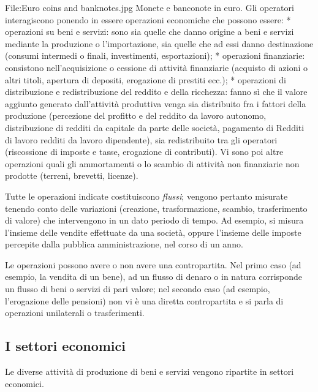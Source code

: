 File:Euro coins and banknotes.jpg Monete e banconote in euro.
Gli operatori interagiscono ponendo in essere operazioni economiche che possono 
essere:
* operazioni su beni e servizi: sono sia quelle che danno origine a beni e 
servizi mediante la produzione o l'importazione, sia quelle che ad essi 
danno destinazione (consumi intermedi o finali, 
investimenti, esportazioni);
* operazioni finanziarie: consistono nell'acquisizione o cessione di 
attività finanziarie (acquisto di azioni o altri 
titoli, apertura di depositi, erogazione di prestiti ecc.);
* operazioni di distribuzione e redistribuzione del reddito e della ricchezza: 
fanno sì che il valore aggiunto generato dall'attività produttiva venga sia 
distribuito fra i fattori della produzione (percezione del profitto e 
del reddito da lavoro autonomo, distribuzione di redditi da 
capitale da parte delle società, pagamento di Redditi di lavoro 
redditi da lavoro dipendente), sia redistribuito tra gli operatori 
(riscossione di imposte e tasse, erogazione di contributi).
Vi sono poi altre operazioni quali gli ammortamenti o lo 
scambio di attività non finanziarie non prodotte (terreni, brevetti, licenze).

Tutte le operazioni indicate costituiscono \emph{flussi}; vengono pertanto 
misurate tenendo conto delle variazioni (creazione, trasformazione, scambio, 
trasferimento di valore) che intervengono in un dato periodo di tempo. Ad 
esempio, si misura l'insieme delle vendite effettuate da una società, oppure 
l'insieme delle imposte percepite dalla pubblica amministrazione, nel corso di 
un anno.

Le operazioni possono avere o non avere una contropartita. Nel primo caso (ad 
esempio, la vendita di un bene), ad un flusso di denaro o in natura corrisponde 
un flusso di beni o servizi di pari valore; nel secondo caso (ad esempio, 
l'erogazione delle pensioni) non vi è una diretta contropartita e si parla 
di operazioni unilaterali o trasferimenti.

\subsection{I settori economici}

Le diverse attività di produzione di beni e servizi vengono ripartite in 
settori economici.

